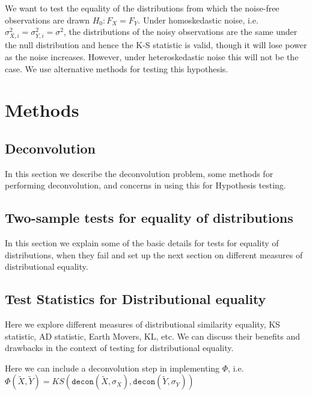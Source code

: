 \documentclass[12pt]{article}
\begin{document}
We want to test the equality of the distributions from which the noise-free observations are drawn $H_0: F_X = F_Y$. Under homoskedastic noise, i.e. $\sigma^2_{X,i} = \sigma^2_{Y,i} = \sigma^2$, the distributions of the noisy observations are the same under the null distribution and hence the K-S statistic is valid, though it will lose power as the noise increases. However, under heteroskedastic noise this will not be the case. We use alternative methods for testing this hypothesis. 



\section{Methods} %
\label{sec:methods}

\subsection{Deconvolution} %
\label{sub:deconvolution}
In this section we describe the deconvolution problem, some methods for performing deconvolution, and concerns in using this for Hypothesis testing. 

\subsection{Two-sample tests for equality of distributions} %
\label{sub:two_sample_tests_for_equality_of_distributions}

In this section we explain some of the basic details for tests for equality of distributions, when they fail and set up the next section on different measures of distributional equality. 



\subsection{Test Statistics for Distributional equality} %
\label{sub:test_statistics_for_distributional_equality}

Here we explore different measures of distributional similarity equality, KS statistic, AD statistic, Earth Movers, KL, etc. We can discuss their benefits and drawbacks in the context of testing for distributional equality. 


Here we can include a deconvolution step in implementing $\Phi$, i.e. $\Phi(\tilde{X}, \tilde{Y}) = KS(\texttt{decon}(\widetilde{X}, \sigma_X), \texttt{decon}(\widetilde{Y}, \sigma_Y))$
\end{document}
